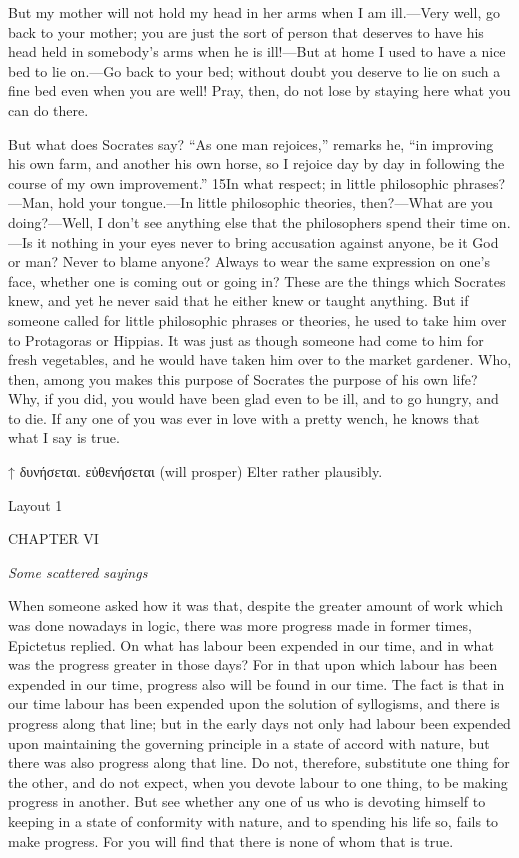 But my mother will not hold my head in her arms when I am ill.—Very well, go back to your mother; you are just the sort of person that deserves to have his head held in somebody's arms when he is ill!—But at home I used to have a nice bed to lie on.—Go back to your bed; without doubt you deserve to lie on such a fine bed even when you are well! Pray, then, do not lose by staying here what you can do there.

But what does Socrates say? ``As one man rejoices,'' remarks he, ``in improving his own farm, and another his own horse, so I rejoice day by day in following the course of my own improvement.'' 15In what respect; in little philosophic phrases?—Man, hold your tongue.—In little philosophic theories, then?—What are you doing?—Well, I don't see anything else that the philosophers spend their time on.—Is it nothing in your eyes never to bring accusation against anyone, be it God or man? Never to blame anyone? Always to wear the same expression on one's face, whether one is coming out or going in? These are the things which Socrates knew, and yet he never said that he either knew or taught anything. But if someone called for little philosophic phrases or theories, he used to take him over to Protagoras or Hippias. It was just as though someone had come to him for fresh vegetables, and he would have taken him over to the market gardener. Who, then, among you makes this purpose of Socrates the purpose of his own life? Why, if you did, you would have been glad even to be ill, and to go hungry, and to die. If any one of you was ever in love with a pretty wench, he knows that what I say is true.



↑ δυνήσεται. εὐθενήσεται (will prosper) Elter rather plausibly.


Layout 1

CHAPTER VI

\emph{Some scattered sayings}

When someone asked how it was that, despite the greater amount of work which was done nowadays in logic, there was more progress made in former times, Epictetus replied. On what has labour been expended in our time, and in what was the progress greater in those days? For in that upon which labour has been expended in our time, progress also will be found in our time. The fact is that in our time labour has been expended upon the solution of syllogisms, and there is progress along that line; but in the early days not only had labour been expended upon maintaining the governing principle in a state of accord with nature, but there was also progress along that line. Do not, therefore, substitute one thing for the other, and do not expect, when you devote labour to one thing, to be making progress in another. But see whether any one of us who is devoting himself to keeping in a state of conformity with nature, and to spending his life so, fails to make progress. For you will find that there is none of whom that is true.

